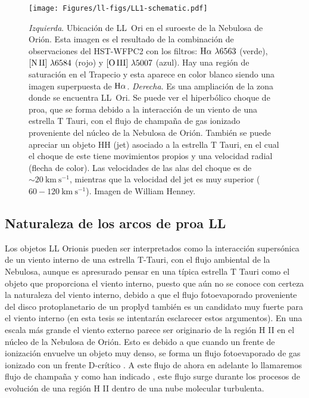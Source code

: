 \begin{figure}
  \centering
  \texttt{[image: Figures/ll-figs/LL1-schematic.pdf]}
  \caption{\textit{Izquierda}. Ubicación de LL~Ori en el suroeste de la Nebulosa de Orión. Esta imagen es el resultado de la combinación de observaciones del HST-WFPC2 \citep{Odell:1996} con los filtros: \(\mathrm{H}\alpha~\lambda6563\) (verde), \(\mathrm{[N\,II]}~\lambda6584\) (rojo) y \(\mathrm{[O\,III]}~\lambda5007\) (azul). Hay una región de saturación en el Trapecio y esta aparece en color blanco siendo una imagen superpuesta de \(\mathrm{H}\alpha\). \textit{Derecha}. Es una ampliación de la zona donde se encuentra LL~Ori. Se puede ver el hiperbólico choque de proa, que se forma debido a la interacción de un viento de una estrella T Tauri, con el flujo de champaña de gas ionizado proveniente del núcleo de la Nebulosa de Orión. También se puede apreciar un objeto HH (jet) asociado a la estrella T Tauri, en el cual el choque de este tiene movimientos propios \citep{Henney:2013a} y una velocidad radial (flecha de color). Las velocidades de las alas del choque es de \(\sim 20 ~\text{km}~\text{s}^{-1}\), mientras que la velocidad del jet es muy superior (\(60-120 ~\text{km}~\text{s}^{-1}\)). Imagen de William Henney.}
  \label{fig:LL1}
\end{figure}

\subsection{Naturaleza de los arcos de proa LL }
\label{sec:choques}

Los objetos LL Orionis pueden ser interpretados como la interacción supersónica de un viento interno de una estrella T-Tauri, con el flujo ambiental de la Nebulosa, aunque es apresurado pensar en una típica estrella T Tauri como el objeto que proporciona el viento interno, puesto que aún no se conoce con certeza la naturaleza del viento interno, debido a que el flujo fotoevaporado proveniente del disco protoplanetario de un proplyd también es un candidato muy fuerte para el viento interno (en esta tesis se intentarán esclarecer estos argumentos). En una escala más grande el viento externo parece ser originario de la región H II en el núcleo de la Nebulosa de Orión. Esto es debido a que cuando un frente de ionización envuelve un objeto muy denso, se forma un flujo fotoevaporado de gas ionizado con un frente D-crítico \citep{Dyson:1968}. A este flujo de ahora en adelante lo llamaremos flujo de champaña y como han indicado \citet{Mellema:2006, Arthur:2011 y Ercolano:2012}, este flujo surge durante los procesos de evolución de una región H II dentro de una nube molecular turbulenta.\\

